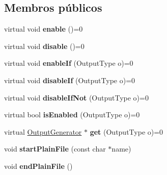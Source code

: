 \subsection*{Membros públicos}
\begin{DoxyCompactItemize}
\item 
\hypertarget{class_output_generator_ad1c349e10e4417179f5eb3cb519670b5}{virtual void {\bfseries enable} ()=0}\label{class_output_generator_ad1c349e10e4417179f5eb3cb519670b5}

\item 
\hypertarget{class_output_generator_ac79a817a699d8fb54e52bf6895db1b0d}{virtual void {\bfseries disable} ()=0}\label{class_output_generator_ac79a817a699d8fb54e52bf6895db1b0d}

\item 
\hypertarget{class_output_generator_af61bfdfc8a2eec6a8b5fdba07c498aef}{virtual void {\bfseries enable\-If} (Output\-Type o)=0}\label{class_output_generator_af61bfdfc8a2eec6a8b5fdba07c498aef}

\item 
\hypertarget{class_output_generator_a7896f34a4678d25b8e17358853393483}{virtual void {\bfseries disable\-If} (Output\-Type o)=0}\label{class_output_generator_a7896f34a4678d25b8e17358853393483}

\item 
\hypertarget{class_output_generator_ab22087d8d000fa5c1177776cb50859f8}{virtual void {\bfseries disable\-If\-Not} (Output\-Type o)=0}\label{class_output_generator_ab22087d8d000fa5c1177776cb50859f8}

\item 
\hypertarget{class_output_generator_ac678da11fb4771270ac71df624b3c926}{virtual bool {\bfseries is\-Enabled} (Output\-Type o)=0}\label{class_output_generator_ac678da11fb4771270ac71df624b3c926}

\item 
\hypertarget{class_output_generator_a868acf27ae48eac48e24f546853fdfe1}{virtual \hyperlink{class_output_generator}{Output\-Generator} $\ast$ {\bfseries get} (Output\-Type o)=0}\label{class_output_generator_a868acf27ae48eac48e24f546853fdfe1}

\item 
\hypertarget{class_output_generator_a623f6878d1b90ffef03c07892ba076ab}{void {\bfseries start\-Plain\-File} (const char $\ast$name)}\label{class_output_generator_a623f6878d1b90ffef03c07892ba076ab}

\item 
\hypertarget{class_output_generator_aae907beb90359ecdfe4086e0a571b8f4}{void {\bfseries end\-Plain\-File} ()}\label{class_output_generator_aae907beb90359ecdfe4086e0a571b8f4}


\end{DoxyCompactItemize}
